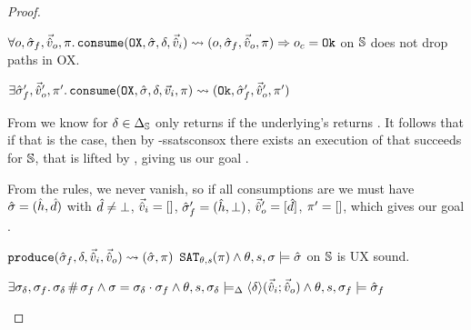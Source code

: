 \begin{proof}

\pfassume \begin{hypvlist}
 $\forall o, \hat{\sigma}_f,\vec{\hat{v}}_o,\pi \ldotp \texttt{consume}(\texttt{OX},\hat{\sigma},\delta,\vec{\hat{v}}_i)\rightsquigarrow (o, \hat{\sigma}_f, \vec{\hat{v}}_o, \pi)\Rightarrow o_c = \texttt{Ok}$
 \consume{} on $\mathbb S$ does not drop paths in OX.
\end{hypvlist}
\pfprove \begin{goalvlist}
 $\exists  \hat{\sigma}_f',\vec{\hat{v}}_o',\pi' \ldotp \texttt{consume}(\texttt{OX}, \hat{\sigma}, \delta,\vec{v}_i,\pi)\rightsquigarrow (\texttt{Ok}, \hat{\sigma}_f', \vec{\hat{v}}_o', \pi')$
\end{goalvlist}

\pfcase{$\delta \in \preds_\mmdl$}

From  we know \consume{} for $\delta\in\preds_\mmdl$ only returns \Ok{} if the underlying's \consume{} returns \Ok. It follows that if that is the case, then by \hyp{ssatsconsox} there exists an execution of \consume{} that succeeds for $\mathbb S$, that is lifted by \PMap, giving us our goal .

\pfcase{$\delta = \domainset$}

From the \consume{} rules, we never vanish, so if all consumptions are \Ok{} we must have $\hat{\sigma}=(\hat{h},\hat{d})$ with $\hat{d}\neq\bot$, $\vec{\hat{v}}_i=[]$, $\hat{\sigma}'_f=(\hat{h},\bot)$, $\vec{\hat{v}}_o'=[\hat{d}]$, $\pi'=[]$, which gives our goal .


\pfassume \begin{hypvlist}
 $\texttt{produce}(\hat{\sigma}_f,\delta,\vec{\hat{v}}_i,\vec{\hat{v}}_o)\rightsquigarrow (\hat{\sigma}, \pi)$
 $\texttt{SAT}_{\mathit{\theta,s}}(\pi) \land \theta,s,\sigma\models\hat{\sigma}$
 \produce{} on $\mathbb S$ is UX sound.
\end{hypvlist}
\pfprove \begin{goalvlist}
 $\exists \sigma_\delta, \sigma_f\ldotp \sigma_\delta\operatorname{\#}\sigma_f \land \sigma=\sigma_\delta\cdot\sigma_f \land \theta,s,\sigma_\delta \models_{\Delta} \left<\delta\right>\!(\vec{\hat{v}}_i;\vec{\hat{v}}_o) \land \theta,s,\sigma_f \models \hat{\sigma}_f$
\end{goalvlist}

\pfcase{$\delta \in \preds_\mmdl$}


\end{proof}
